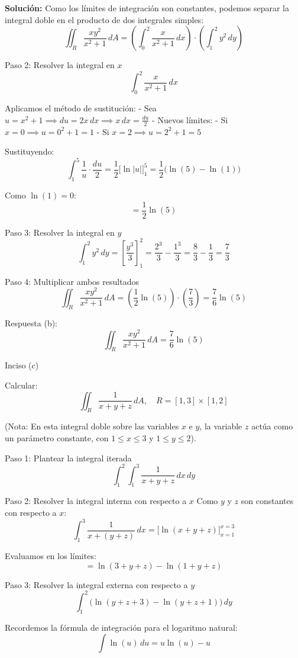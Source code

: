 \documentclass[12pt,a4paper]{report}
\newcommand{\solutionname}{Solución:}
\newenvironment{solution}{
 	\par\noindent\textbf{\color{structurecolor}\solutionname}
 	\color{black!90}}{\hfill\quad\par}
\begin{document}
\begin{solution}
Como los límites de integración son constantes, podemos separar la integral doble en el producto de dos integrales simples:
$$\iint_{R} \frac{xy^2}{x^2 + 1} \, dA = \left(\int_{0}^{2} \frac{x}{x^2 + 1} \, dx\right) \cdot \left(\int_{1}^{2} y^2 \, dy\right)$$

 Paso 2: Resolver la integral en $x$
$$\int_{0}^{2} \frac{x}{x^2 + 1} \, dx$$

Aplicamos el método de sustitución:
- Sea $u = x^2 + 1 \implies du = 2x \, dx \implies x \, dx = \frac{du}{2}$
- Nuevos límites:
  - Si $x = 0 \implies u = 0^2 + 1 = 1$
  - Si $x = 2 \implies u = 2^2 + 1 = 5$

Sustituyendo:
$$\int_{1}^{5} \frac{1}{u} \cdot \frac{du}{2} = \frac{1}{2} \Big[ \ln|u| \Big]_{1}^{5} = \frac{1}{2} \big(\ln(5) - \ln(1)\big)$$

Como $\ln(1) = 0$:
$$= \frac{1}{2} \ln(5)$$

 Paso 3: Resolver la integral en $y$
$$\int_{1}^{2} y^2 \, dy = \left[ \frac{y^3}{3} \right]_{1}^{2} = \frac{2^3}{3} - \frac{1^3}{3} = \frac{8}{3} - \frac{1}{3} = \frac{7}{3}$$

 Paso 4: Multiplicar ambos resultados
$$\iint_{R} \frac{xy^2}{x^2 + 1} \, dA = \left(\frac{1}{2} \ln(5)\right) \cdot \left(\frac{7}{3}\right) = \frac{7}{6} \ln(5)$$

Respuesta (b):
$$\iint_{R} \frac{xy^2}{x^2 + 1} \, dA = \frac{7}{6} \ln(5)$$



Inciso (c)

Calcular:
$$\iint_{R} \frac{1}{x + y + z} \, dA, \quad R = [1, 3] \times [1, 2]$$

(Nota: En esta integral doble sobre las variables $x$ e $y$, la variable $z$ actúa como un parámetro constante, con $1 \le x \le 3$ y $1 \le y \le 2$).

 Paso 1: Plantear la integral iterada
$$\int_{1}^{2} \int_{1}^{3} \frac{1}{x + y + z} \, dx \, dy$$

 Paso 2: Resolver la integral interna con respecto a $x$
Como $y$ y $z$ son constantes con respecto a $x$:
$$\int_{1}^{3} \frac{1}{x + (y + z)} \, dx = \Big[ \ln(x + y + z) \Big]_{x=1}^{x=3}$$

Evaluamos en los límites:
$$= \ln(3 + y + z) - \ln(1 + y + z)$$

 Paso 3: Resolver la integral externa con respecto a $y$
$$\int_{1}^{2} \Big( \ln(y + z + 3) - \ln(y + z + 1) \Big) \, dy$$

Recordemos la fórmula de integración para el logaritmo natural:
$$\int \ln(u) \, du = u \ln(u) - u$$


\end{solution}
\end{document}
